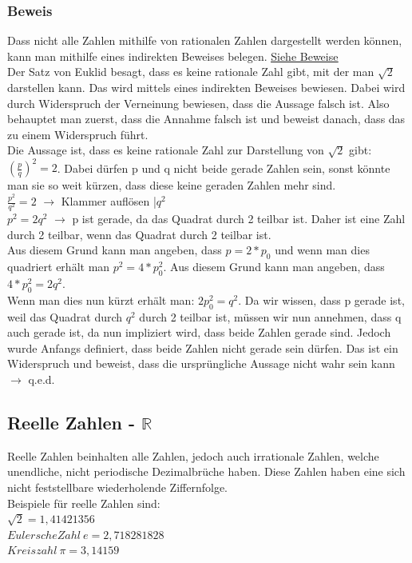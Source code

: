 \documentclass{article}
\newcommand{\R}{\mathbb{R}}
\begin{document}
	\subsubsection{Beweis}
	Dass nicht alle Zahlen mithilfe von rationalen Zahlen dargestellt werden können, kann man mithilfe eines indirekten Beweises belegen. \hyperref[sec:Mathematische Beweise]{\underline{Siehe Beweise}} \\ 
	Der Satz von Euklid besagt, dass es keine rationale Zahl gibt, mit der man $\sqrt{2}$ darstellen kann. Das wird mittels eines indirekten Beweises bewiesen. Dabei wird durch Widerspruch der Verneinung bewiesen, dass die Aussage falsch ist. Also behauptet man zuerst, dass die Annahme falsch ist und beweist danach, dass das zu einem Widerspruch führt. \\
	Die Aussage ist, dass es keine rationale Zahl zur Darstellung von $\sqrt{2}$ gibt: $(\frac{p}{q})^2 = 2$. Dabei dürfen p und q nicht beide gerade Zahlen sein, sonst könnte man sie so weit kürzen, dass diese keine geraden Zahlen mehr sind. \\
	$\frac{p^2}{q^2} = 2$ $\to$ Klammer auflösen |$q^2$ \\
	$p^2 = 2q^2$ $\to$ p ist gerade, da das Quadrat durch 2 teilbar ist. Daher ist eine Zahl durch 2 teilbar, wenn das Quadrat durch 2 teilbar ist. \\
	Aus diesem Grund kann man angeben, dass $p = 2*p_0$ und wenn man dies quadriert erhält man $p^2 = 4*p_0^2$. Aus diesem Grund kann man angeben, dass $4*p_0^2 = 2q^2$. \\
	Wenn man dies nun kürzt erhält man: $2p_0^2 = q^2$. Da wir wissen, dass p gerade ist, weil das Quadrat durch $q^2$ durch 2 teilbar ist, müssen wir nun annehmen, dass q auch gerade ist, da nun impliziert wird, dass beide Zahlen gerade sind. Jedoch wurde Anfangs definiert, dass beide Zahlen nicht gerade sein dürfen. Das ist ein Widerspruch und beweist, dass die ursprüngliche Aussage nicht wahr sein kann $\to$ q.e.d.
	\subsection{Reelle Zahlen - \texorpdfstring{$\R$}{}}
	Reelle Zahlen beinhalten alle Zahlen, jedoch auch irrationale Zahlen, welche unendliche, nicht periodische Dezimalbrüche haben. Diese Zahlen haben eine sich nicht feststellbare wiederholende Ziffernfolge. \\ 
	Beispiele für reelle Zahlen sind: \\
	$\sqrt{2}=1,41421356$ \\
	$Eulersche Zahl\ e=2,718281828$ \\
	$Kreiszahl\ \pi = 3,14159$
\end{document}
